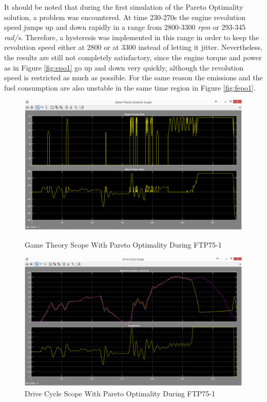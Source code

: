 It should be noted that during the first simulation of the Pareto Optimality solution, a problem was encountered. At time 230-270s the engine revolution speed jumps up and down rapidly in a range from 2800-3300 \textit{rpm} or 293-345 \textit{rad/s}. Therefore, a hysteresis was implemented in this range in order to keep the revolution speed either at 2800 or at 3300 instead of letting it jitter. Nevertheless, the results are still not completely satisfactory, since the engine torque and power as in Figure \ref{fig:epo1} go up and down very quickly, although the revolution speed is restricted as much as possible. For the same reason the emissions and the fuel consumption are also unstable in the same time region in Figure \ref{fig:fepo1}.

\begin{figure}[hp]
\centering
\includegraphics[scale=0.47]{figures/Pareto/FTP75-1/gameTheory30Juni}
\caption{Game Theory Scope With Pareto Optimality During FTP75-1}
\label{fig:gtpo1}
\includegraphics[scale=0.45]{figures/Pareto/FTP75-1/driveCycle30Juni}
\caption{Drive Cycle Scope With Pareto Optimality During FTP75-1}
\label{fig:dcpo1}
\end{figure}



